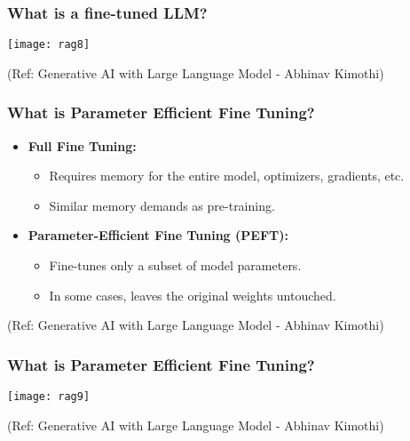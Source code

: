 \begin{frame}[fragile]\frametitle{What is a fine-tuned LLM?}


		\begin{center}
		\texttt{[image: rag8]}
		\end{center}

{\tiny (Ref: Generative AI with Large Language Model - Abhinav  Kimothi)}

\end{frame}


\begin{frame}[fragile]\frametitle{What is Parameter Efficient Fine Tuning?}

\begin{itemize}
  \item \textbf{Full Fine Tuning:}
    \begin{itemize}
      \item Requires memory for the entire model, optimizers, gradients, etc.
      \item Similar memory demands as pre-training.
    \end{itemize}

  \item \textbf{Parameter-Efficient Fine Tuning (PEFT):}
    \begin{itemize}
      \item Fine-tunes only a subset of model parameters.
      \item In some cases, leaves the original weights untouched.
    \end{itemize}
\end{itemize}


{\tiny (Ref: Generative AI with Large Language Model - Abhinav  Kimothi)}

\end{frame}


\begin{frame}[fragile]\frametitle{What is Parameter Efficient Fine Tuning?}


		\begin{center}
		\texttt{[image: rag9]}
		\end{center}

{\tiny (Ref: Generative AI with Large Language Model - Abhinav  Kimothi)}

\end{frame}

